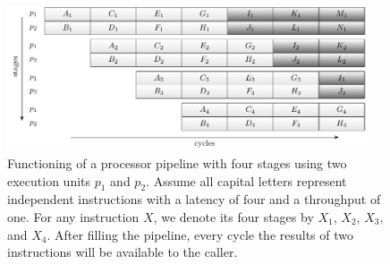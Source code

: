 \documentclass{stdlocal}
\begin{document}
    \begin{figure}
      \center
      \includegraphics[width=0.95\textwidth]{figures/multiple_unit_pipeline.pdf}
      \caption[Multiple Execution Unit Processor Pipeline]{%
        Functioning of a processor pipeline with four stages using two execution units $p_1$ and $p_2$.
        Assume all capital letters represent independent instructions with a latency of four and a throughput of one.
        For any instruction $X$, we denote its four stages by $X_1$, $X_2$, $X_3$, and $X_4$.
        After filling the pipeline, every cycle the results of two instructions will be available to the caller.
      }
      \label{fig:multiple-unit-pipeline}
    \end{figure}
\end{document}
